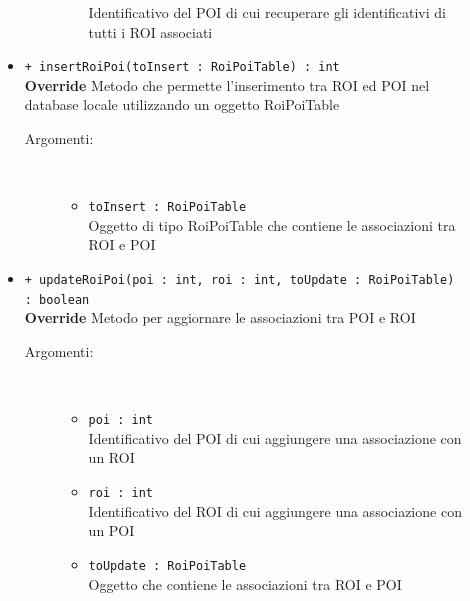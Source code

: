 \documentclass[../DefinizioneDiProdotto.tex]{subfiles}
\begin{document}
\begin{description}
\begin{itemize}
\begin{description}
\begin{itemize}
				Identificativo del POI di cui recuperare gli identificativi di tutti i ROI associati\end{itemize}
		\end{description}
		\item \texttt{+ insertRoiPoi(toInsert : RoiPoiTable) : int}\\
		\textbf{Override} Metodo che permette l'inserimento tra ROI ed POI nel database locale utilizzando un oggetto RoiPoiTable
		\begin{description}
			\item[Argomenti:] \
			\begin{itemize}
				\item \texttt{toInsert : RoiPoiTable}\\
				Oggetto di tipo RoiPoiTable che contiene le associazioni tra ROI e POI\end{itemize}
		\end{description}
		\item \texttt{+ updateRoiPoi(poi : int, roi : int, toUpdate : RoiPoiTable) : boolean}\\
		\textbf{Override} Metodo per aggiornare le associazioni tra POI e ROI
		\begin{description}
			\item[Argomenti:] \
			\begin{itemize}
				\item \texttt{poi : int}\\
				Identificativo del POI di cui aggiungere una associazione con un ROI\item \texttt{roi : int}\\
				Identificativo del ROI di cui aggiungere una associazione con un POI\item \texttt{toUpdate : RoiPoiTable}\\
				Oggetto che contiene le associazioni tra ROI e POI\end{itemize}
		\end{description}
	\end{itemize}
\end{description}
\end{document}
